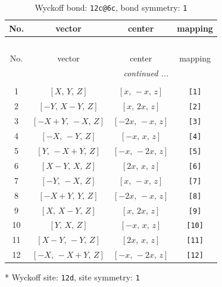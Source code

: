 \documentclass[fleqn,8pt]{jsarticle}
\begin{document}
\begin{longtable}{cccc}
\caption{Wyckoff bond: {\tt 12c@6c}, bond symmetry: {\tt 1}}
 \\
 \hline \hline
No. & vector & center & mapping \\ \hline \endfirsthead

\multicolumn{3}{l}{\tablename\ \thetable{}} \\
 \hline \hline
No. & vector & center & mapping \\ \hline \endhead

 \hline \hline
\multicolumn{3}{r}{\footnotesize\it continued ...} \\ \endfoot

 \hline \hline
\multicolumn{3}{r}{} \\ \endlastfoot

1 & $\left[ X,\, Y,\, Z \right]$ & $\left[ x,\, - x,\, z \right]$ & {\tt [1]} \\ \hline
2 & $\left[ - Y,\, X - Y,\, Z \right]$ & $\left[ x,\, 2 x,\, z \right]$ & {\tt [2]} \\ \hline
3 & $\left[ - X + Y,\, - X,\, Z \right]$ & $\left[ - 2 x,\, - x,\, z \right]$ & {\tt [3]} \\ \hline
4 & $\left[ - X,\, - Y,\, Z \right]$ & $\left[ - x,\, x,\, z \right]$ & {\tt [4]} \\ \hline
5 & $\left[ Y,\, - X + Y,\, Z \right]$ & $\left[ - x,\, - 2 x,\, z \right]$ & {\tt [5]} \\ \hline
6 & $\left[ X - Y,\, X,\, Z \right]$ & $\left[ 2 x,\, x,\, z \right]$ & {\tt [6]} \\ \hline
7 & $\left[ - Y,\, - X,\, Z \right]$ & $\left[ x,\, - x,\, z \right]$ & {\tt [7]} \\ \hline
8 & $\left[ - X + Y,\, Y,\, Z \right]$ & $\left[ - 2 x,\, - x,\, z \right]$ & {\tt [8]} \\ \hline
9 & $\left[ X,\, X - Y,\, Z \right]$ & $\left[ x,\, 2 x,\, z \right]$ & {\tt [9]} \\ \hline
10 & $\left[ Y,\, X,\, Z \right]$ & $\left[ - x,\, x,\, z \right]$ & {\tt [10]} \\ \hline
11 & $\left[ X - Y,\, - Y,\, Z \right]$ & $\left[ 2 x,\, x,\, z \right]$ & {\tt [11]} \\ \hline
12 & $\left[ - X,\, - X + Y,\, Z \right]$ & $\left[ - x,\, - 2 x,\, z \right]$ & {\tt [12]} \\
\end{longtable}
* Wyckoff site: {\tt 12d}, site symmetry: {\tt 1}
\renewcommand{\arraystretch}{1.2}
\end{document}
